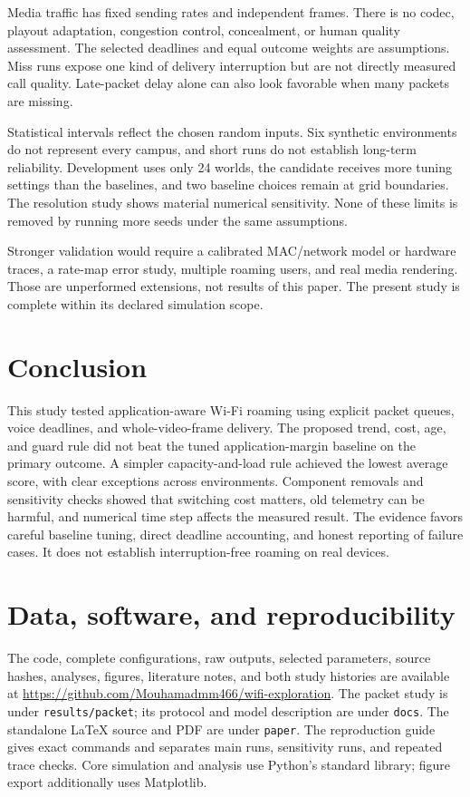 \documentclass[11pt,a4paper]{article}
\newcommand{\code}[1]{\texttt{\small #1}}
\begin{document}
Media traffic has fixed sending rates and independent frames. There is no codec, playout adaptation, congestion control, concealment, or human quality assessment. The selected deadlines and equal outcome weights are assumptions. Miss runs expose one kind of delivery interruption but are not directly measured call quality. Late-packet delay alone can also look favorable when many packets are missing.

Statistical intervals reflect the chosen random inputs. Six synthetic environments do not represent every campus, and short runs do not establish long-term reliability. Development uses only 24 worlds, the candidate receives more tuning settings than the baselines, and two baseline choices remain at grid boundaries. The resolution study shows material numerical sensitivity. None of these limits is removed by running more seeds under the same assumptions.

Stronger validation would require a calibrated MAC/network model or hardware traces, a rate-map error study, multiple roaming users, and real media rendering. Those are unperformed extensions, not results of this paper. The present study is complete within its declared simulation scope.

\section{Conclusion}
This study tested application-aware Wi-Fi roaming using explicit packet queues, voice deadlines, and whole-video-frame delivery. The proposed trend, cost, age, and guard rule did not beat the tuned application-margin baseline on the primary outcome. A simpler capacity-and-load rule achieved the lowest average score, with clear exceptions across environments. Component removals and sensitivity checks showed that switching cost matters, old telemetry can be harmful, and numerical time step affects the measured result. The evidence favors careful baseline tuning, direct deadline accounting, and honest reporting of failure cases. It does not establish interruption-free roaming on real devices.

\section*{Data, software, and reproducibility}
The code, complete configurations, raw outputs, selected parameters, source hashes, analyses, figures, literature notes, and both study histories are available at \url{https://github.com/Mouhamadmm466/wifi-exploration}. The packet study is under \code{results/packet}; its protocol and model description are under \code{docs}. The standalone LaTeX source and PDF are under \code{paper}. The reproduction guide gives exact commands and separates main runs, sensitivity runs, and repeated trace checks. Core simulation and analysis use Python's standard library; figure export additionally uses Matplotlib.
\end{document}
